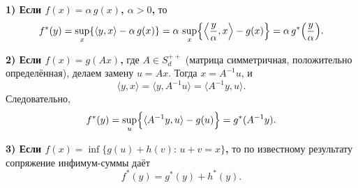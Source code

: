 \documentclass[a4paper,12pt]{article}
\begin{document}
	\medskip
	
	\textbf{1) Если $f(x)=\alpha\, g(x)$, $\alpha>0$,} то
	\[
	f^*(y)=\sup_{x}\{ \langle y,x\rangle-\alpha\, g(x)\}
	=\alpha\,\sup_{x}\Bigl\{\Bigl\langle \frac{y}{\alpha},x\Bigr\rangle-g(x)\Bigr\}
	=\alpha\, g^*\Bigl(\frac{y}{\alpha}\Bigr).
	\]
	
	\medskip
	
	\textbf{2) Если $f(x)=g(Ax)$,} где $A\in S_d^{++}$ (матрица симметричная, положительно определённая), делаем замену $u=Ax$. Тогда $x=A^{-1}u$, и
	\[
	\langle y,x\rangle=\langle y, A^{-1}u\rangle=\langle A^{-1}y,u\rangle.
	\]
	Следовательно,
	\[
	f^*(y)=\sup_{u}\Bigl\{\langle A^{-1}y,u\rangle-g(u)\Bigr\}=g^*(A^{-1}y).
	\]
	
	\medskip
	
	\textbf{3) Если $f(x)=\inf\{g(u)+h(v):\, u+v=x\}$,} то по известному результату сопряжение инфимум-суммы даёт
	\[
	f^*(y)=g^*(y)+h^*(y).
	\]
	
	\bigskip
\end{document}
